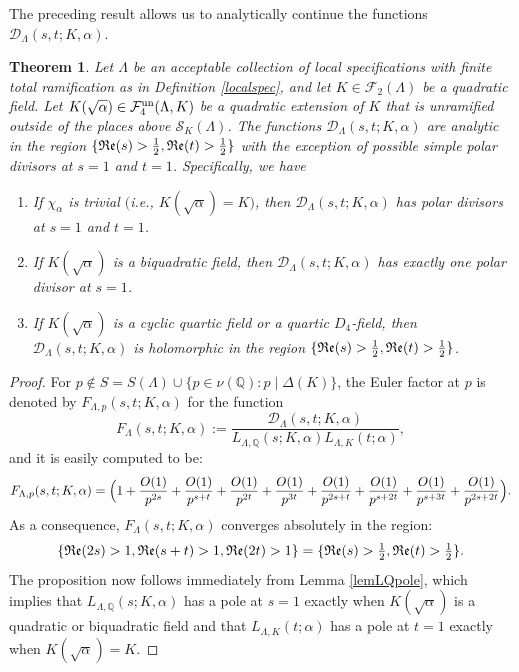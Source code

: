 \documentclass[10pt]{article}
\theoremstyle{plain}
\newtheorem{thm}{Theorem}[section]
\theoremstyle{definition}
\theoremstyle{remark}
\renewcommand{\Re}{\frak{Re}}
\def\un{{\rm un}}
\def\val{{\nu}}
\def\Q{{\mathbb Q}}
\def\Q{{\mathbb Q}}
\def\bQ{{\mathbb Q}}
\def\cD{{\mathcal D}}
\def\cF{{\mathcal F}}
\def\bQ{{\mathbb Q}}
\def\cS{{\mathcal S}}
\begin{document}
The preceding result allows us to analytically continue the functions
$\cD_\Lambda(s,t;K,\alpha)$.
\begin{thm}\label{proppole2}
Let $\Lambda$ be an acceptable collection of local 
specifications with finite total ramification as in Definition \ref{localspec}, and let $K \in
\cF_2(\Lambda)$ be a quadratic field. Let $K(\sqrt{\alpha}) \in
\cF_4^{\un}(\Lambda,K)$ be a quadratic extension of $K$ that is
unramified outside of the places above $\cS_K(\Lambda)$.
The functions $\cD_\Lambda(s,t;K,\alpha)$ are analytic in the region
$\{\Re(s)>\frac12,\Re(t)>\frac12\}$ with the exception of possible
simple polar divisors at $s=1$ and $t=1$. Specifically, we have
\begin{enumerate}
\item If $\chi_\alpha$ is trivial $($i.e., $K(\sqrt{\alpha})=K)$, then
  $\cD_\Lambda(s,t;K,\alpha)$ has polar divisors at $s=1$ and $t=1$. 
\item If $K(\sqrt{\alpha})$ is a biquadratic field, then
  $\cD_\Lambda(s,t;K,\alpha)$ has exactly one polar divisor at $s=1$.
\item If $K(\sqrt{\alpha})$ is a cyclic quartic field
  or a quartic $D_4$-field, then $\cD_\Lambda(s,t;K,\alpha)$ is holomorphic in
  the region $\{\Re(s)>\frac12,\Re(t)>\frac12\}$.
\end{enumerate}
\end{thm}
\begin{proof}
For $p\not\in S=S(\Lambda) \cup \{p \in
\val(\bQ) : p \mid \Delta(K)\}$, the Euler factor at $p$ is denoted by
$F_{\Lambda,p}(s,t;K,\alpha)$ for the function
\begin{equation}\label{eqFfunc}
F_\Lambda(s,t;K,\alpha):=\frac{\cD_\Lambda(s,t;K,\alpha)}
{L_{\Lambda,\Q}(s;K,\alpha)L_{\Lambda,K}(t;\alpha)},
\end{equation}
and it is easily computed to be:
\begin{equation}\label{eqFfunc1}
  F_{\Lambda,p}(s,t;K,\alpha)=\Bigl(
  1+\frac{O(1)}{p^{2s}}+\frac{O(1)}{p^{s+t}}+\frac{O(1)}{p^{2t}}
  +\frac{O(1)}{p^{3t}}+\frac{O(1)}{p^{2s+t}}+\frac{O(1)}{p^{s+2t}}
  +\frac{O(1)}{p^{s+3t}}+\frac{O(1)}{p^{2s+2t}}\Bigr).
\end{equation}
As a consequence, $F_\Lambda(s,t;K,\alpha)$ converges absolutely in the
region:
\begin{equation*}
  \{\Re(2s)>1,\Re(s+t)>1,\Re(2t)>1\}=
\{\Re(s)>{\textstyle\frac{1}{2}},\Re(t)>{\textstyle\frac{1}{2}}\}.
\end{equation*}
The proposition now follows immediately from Lemma \ref{lemLQpole},
which implies that $L_{\Lambda,\Q}(s;K,\alpha)$ has a pole at $s=1$
exactly when $K(\sqrt{\alpha})$ is a quadratic or biquadratic field and that
$L_{\Lambda,K}(t;\alpha)$ has a pole at $t=1$ exactly when
$K(\sqrt{\alpha})= K$.
\end{proof}
\end{document}
